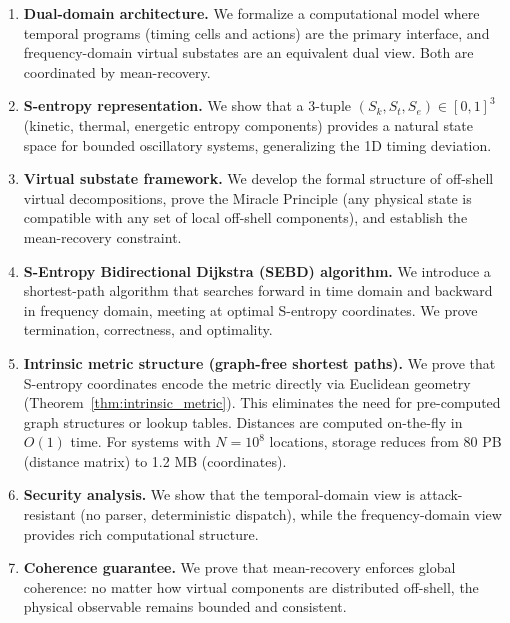 \documentclass[twocolumn,11pt,a4paper]{article}
\newcommand{\Sk}{S_{k}}
\newcommand{\St}{S_{t}}
\newcommand{\Se}{S_{e}}
\begin{document}
\begin{enumerate}[leftmargin=1.5em,topsep=2pt,itemsep=1pt]
  \item \textbf{Dual-domain architecture.} We formalize a computational model where temporal programs (timing cells and actions) are the primary interface, and frequency-domain virtual substates are an equivalent dual view. Both are coordinated by mean-recovery.

  \item \textbf{S-entropy representation.} We show that a 3-tuple $(\Sk, \St, \Se) \in [0,1]^3$ (kinetic, thermal, energetic entropy components) provides a natural state space for bounded oscillatory systems, generalizing the 1D timing deviation.

  \item \textbf{Virtual substate framework.} We develop the formal structure of off-shell virtual decompositions, prove the Miracle Principle (any physical state is compatible with any set of local off-shell components), and establish the mean-recovery constraint.

  \item \textbf{S-Entropy Bidirectional Dijkstra (SEBD) algorithm.} We introduce a shortest-path algorithm that searches forward in time domain and backward in frequency domain, meeting at optimal S-entropy coordinates. We prove termination, correctness, and optimality.

  \item \textbf{Intrinsic metric structure (graph-free shortest paths).} We prove that S-entropy coordinates encode the metric directly via Euclidean geometry (Theorem~\ref{thm:intrinsic_metric}). This eliminates the need for pre-computed graph structures or lookup tables. Distances are computed on-the-fly in $O(1)$ time. For systems with $N=10^8$ locations, storage reduces from 80 PB (distance matrix) to 1.2 MB (coordinates).

  \item \textbf{Security analysis.} We show that the temporal-domain view is attack-resistant (no parser, deterministic dispatch), while the frequency-domain view provides rich computational structure.

  \item \textbf{Coherence guarantee.} We prove that mean-recovery enforces global coherence: no matter how virtual components are distributed off-shell, the physical observable remains bounded and consistent.
\end{enumerate}
\end{document}
